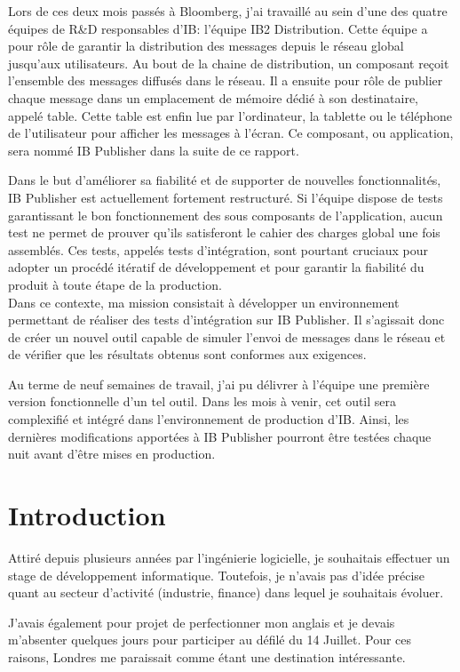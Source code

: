 \documentclass[11pt, oneside, titlepage, a4paper]{article}
\begin{document}
\begin{small}
Lors de ces deux mois passés à Bloomberg, j'ai travaillé au sein d'une des quatre équipes de R\&D responsables d'IB: l'équipe IB2 Distribution. Cette équipe a pour rôle de garantir la distribution des messages depuis le réseau global jusqu'aux utilisateurs. Au bout de la chaine de distribution, un composant reçoit l'ensemble des messages diffusés dans le réseau. Il a ensuite pour rôle de publier chaque message dans un emplacement de mémoire dédié à son destinataire, appelé table. Cette table est enfin lue par l'ordinateur, la tablette ou le téléphone de l'utilisateur pour afficher les messages à l'écran. Ce composant, ou application, sera nommé IB Publisher dans la suite de ce rapport.

Dans le but d'améliorer sa fiabilité et de supporter de nouvelles fonctionnalités, IB Publisher est actuellement fortement restructuré. Si l'équipe dispose de tests garantissant le bon fonctionnement des sous composants de l'application, aucun test ne permet de prouver qu'ils satisferont le cahier des charges global une fois assemblés. Ces tests, appelés tests d'intégration, sont pourtant cruciaux pour adopter un procédé itératif de développement et pour garantir la fiabilité du produit à toute étape de la production.
\\

Dans ce contexte, ma mission consistait à développer un environnement permettant de réaliser des tests d'intégration sur IB Publisher. Il s'agissait donc de créer un nouvel outil capable de simuler l'envoi de messages dans le réseau et de vérifier que les résultats obtenus sont conformes aux exigences.

Au terme de neuf semaines de travail, j'ai pu délivrer à l'équipe une première version fonctionnelle d'un tel outil. Dans les mois à venir, cet outil sera complexifié et intégré dans l'environnement de production d'IB. Ainsi, les dernières modifications apportées à IB Publisher pourront être testées chaque nuit avant d'être mises en production.
\end{small}
\newpage
\tableofcontents
\newpage
\section{Introduction}
Attiré depuis plusieurs années par l'ingénierie logicielle, je souhaitais effectuer un stage de développement informatique. Toutefois, je n'avais pas d'idée précise quant au secteur d'activité (industrie, finance) dans lequel je souhaitais évoluer.

J'avais également pour projet de perfectionner mon anglais et je devais m'absenter quelques jours pour participer au défilé du 14 Juillet. Pour ces raisons, Londres me paraissait comme étant une destination intéressante.
\\
\end{document}
